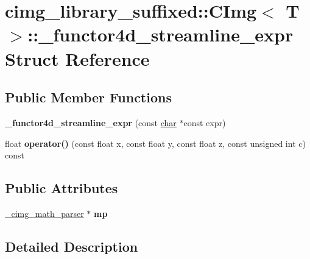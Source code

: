 \hypertarget{structcimg__library__suffixed_1_1CImg_1_1__functor4d__streamline__expr}{}\section{cimg\+\_\+library\+\_\+suffixed\+:\+:C\+Img$<$ T $>$\+:\+:\+\_\+functor4d\+\_\+streamline\+\_\+expr Struct Reference}
\label{structcimg__library__suffixed_1_1CImg_1_1__functor4d__streamline__expr}
\subsection*{Public Member Functions}
\begin{DoxyCompactItemize}
\item 
\mbox{\label{structcimg__library__suffixed_1_1CImg_1_1__functor4d__streamline__expr_a705878a3cc11c1f31b217fa036fa208d}} 
{\bfseries \+\_\+functor4d\+\_\+streamline\+\_\+expr} (const \hyperlink{classchar}{char} $\ast$const expr)
\item 
\mbox{\label{structcimg__library__suffixed_1_1CImg_1_1__functor4d__streamline__expr_a1d8e76a4547c9d0289e43f6d3e7a23d7}} 
float {\bfseries operator()} (const float x, const float y, const float z, const unsigned int c) const
\end{DoxyCompactItemize}
\subsection*{Public Attributes}
\begin{DoxyCompactItemize}
\item 
\mbox{\label{structcimg__library__suffixed_1_1CImg_1_1__functor4d__streamline__expr_a6a076746dae7afecdab342a31bc4f783}} 
\hyperlink{structcimg__library__suffixed_1_1CImg_1_1__cimg__math__parser}{\+\_\+cimg\+\_\+math\+\_\+parser} $\ast$ {\bfseries mp}
\end{DoxyCompactItemize}


\subsection{Detailed Description}
